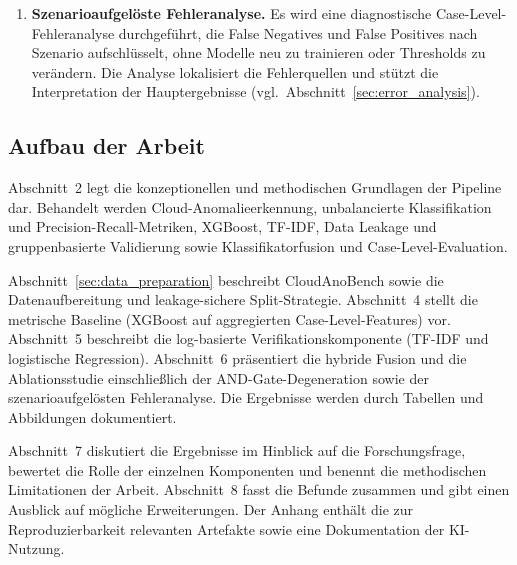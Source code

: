 \begin{enumerate}
  \item \textbf{Szenarioaufgelöste Fehleranalyse.}
    Es wird eine diagnostische Case-Level-Feh\-ler\-analyse durchgeführt, die
    False Negatives und False Positives nach Szenario aufschlüsselt, ohne
    Modelle neu zu trainieren oder Thresholds zu verändern. Die Analyse
    lokalisiert die Fehlerquellen und stützt die Interpretation der Haupt\-ergebnisse
    (vgl.\ Abschnitt~\ref{sec:error_analysis}).
\end{enumerate}

\subsection{Aufbau der Arbeit}

Abschnitt~2 legt die konzeptionellen und methodischen Grundlagen der Pipeline dar.
Behandelt werden Cloud-Anoma\-lie\-erkennung, unbalancierte Klassifikation und
Precision-Recall-Metriken, XGBoost, TF-IDF, Data Leakage und gruppenbasierte
Validierung sowie Klassifikatorfusion und Case-Level-Evaluation.

Abschnitt~\ref{sec:data_preparation} beschreibt CloudAnoBench sowie die Daten\-aufbereitung
und leakage-sichere Split-Strategie. Abschnitt~4 stellt die metrische Baseline
(XGBoost auf aggregierten Case-Level-Features) vor. Abschnitt~5 beschreibt die
log-basierte Verifikationskomponente (TF-IDF und logistische Regression).
Abschnitt~6 präsentiert die hybride Fusion und die Ablationsstudie einschließlich
der AND-Gate-Degeneration sowie der szenarioaufgelösten Fehleranalyse. Die
Ergebnisse werden durch Tabellen und Abbildungen dokumentiert.

Abschnitt~7 diskutiert die Ergebnisse im Hinblick auf die Forschungsfrage,
bewertet die Rolle der einzelnen Komponenten und benennt die methodischen
Limitationen der Arbeit. Abschnitt~8 fasst die Befunde zusammen und gibt einen
Ausblick auf mögliche Erweiterungen. Der Anhang enthält die zur Reproduzierbarkeit
relevanten Artefakte sowie eine Dokumentation der KI-Nutzung.
